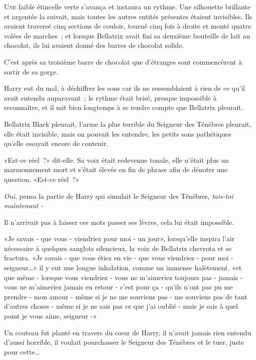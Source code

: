 
\lettrine{U}{ne} faible étincelle verte s'avança et instaura un rythme. Une silhouette brillante et argentée la suivait, mais toutes les autres entités présentes étaient invisibles. Ils avaient traversé cinq sections de couloir, tourné cinq fois à droite et monté quatre volées de marches~; et lorsque Bellatrix avait fini sa deuxième bouteille de lait au chocolat, ils lui avaient donné des barres de chocolat solide.

C'est après sa troisième barre de chocolat que d'étranges sont commencèrent à sortir de sa gorge.

Harry eut du mal, à déchiffrer les sons car ils ne ressemblaient à rien de ce qu'il avait entendu auparavant~; le rythme était brisé, presque impossible à reconnaître, et il mit bien longtemps à se rendre compte que Bellatrix pleurait.

Bellatrix Black pleurait, l'arme la plus terrible du Seigneur des Ténèbres pleurait, elle était invisible, mais on pouvait les entendre, les petits sons pathétiques qu'elle essayait encore de contenir.

«Est-ce réel~?» dit-elle. Sa voix était redevenue tonale, elle n'était plus un marmonnement mort et s'était élevée en fin de phrase afin de dénoter une question. «Est-ce réel~?»

\emph{Oui}, pensa la partie de Harry qui simulait le Seigneur des Ténèbres, \emph{tais-toi maintenant -}

Il n'arrivait pas à laisser ces mots passer ses lèvres, cela lui était impossible.

«Je savais - que vous - viendriez pour moi - un jour», lorsqu'elle inspira l'air nécessaire à quelques sanglots silencieux, la voix de Bellatrix chevrota et se fractura. «Je savais - que vous étiez en vie - que vous viendriez - pour moi - seigneur…» il y eut une longue inhalation, comme un immense halètement, «et que même - lorsque vous viendriez - vous ne m'aimeriez toujours pas - jamais - vous ne m'aimeriez jamais en retour - c'est pour ça - qu'ils n'ont pas pu me prendre - mon amour - même si je ne me souviens pas - me souviens pas de tant d'autres choses - même si je ne sais pas ce que j'ai oublié - mais je sais à quel point je vous aime, seigneur -»

Un couteau fut planté en travers du cœur de Harry, il n'avait jamais rien entendu d'aussi horrible, il voulait pourchasser le Seigneur des Ténèbres et le tuer, juste pour cette…

